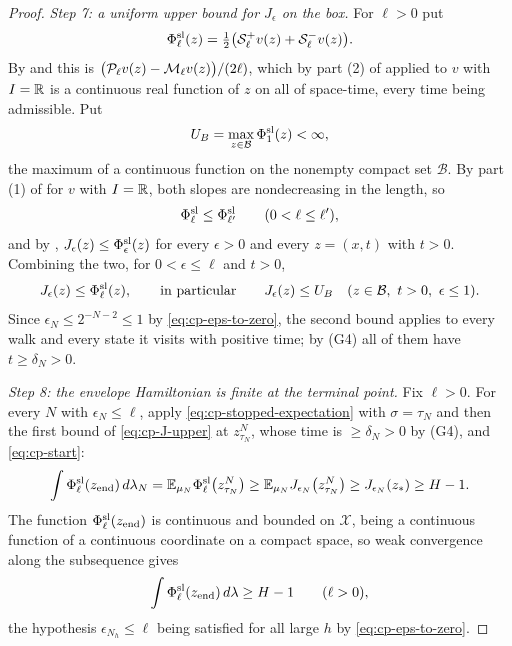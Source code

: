 \begin{proof}
\emph{Step 7: a uniform upper bound for $J_\epsilon$ on the box.}
For $\ell>0$ put
\[
  \Phi^{\rm sl}_\ell(z)=\tfrac12\bigl(\mathcal{S}^+_\ell v(z)+\mathcal{S}^-_\ell v(z)\bigr).
\]
By  and  this is
$\bigl(\mathcal{P}_\ell v(z)-\mathcal{M}_\ell v(z)\bigr)/(2\ell)$, which by part (2) of
 applied to $v$ with $I=\mathbb{R}$ is a continuous real
function of $z$ on all of space-time, every time being admissible. Put
\[
  U_B=\max_{z\in\mathcal B}\Phi^{\rm sl}_1(z)<\infty,
\]
the maximum of a continuous function on the nonempty compact set $\mathcal B$.
By part (1) of  for $v$ with $I=\mathbb{R}$, both
slopes are nondecreasing in the length, so
\begin{equation}\label{eq:cp-slope-mono}
  \Phi^{\rm sl}_\ell\le\Phi^{\rm sl}_{\ell'}\qquad(0<\ell\le\ell'),
\end{equation}
and by ,
$J_\epsilon(z)\le\Phi^{\rm sl}_\epsilon(z)$ for every $\epsilon>0$ and every
$z=(x,t)$ with $t>0$. Combining the two, for $0<\epsilon\le\ell$ and $t>0$,
\begin{equation}\label{eq:cp-J-upper}
  J_\epsilon(z)\le\Phi^{\rm sl}_\ell(z),\qquad\text{in particular}\qquad
  J_\epsilon(z)\le U_B\quad(z\in\mathcal B,\ t>0,\ \epsilon\le1).
\end{equation}
Since $\epsilon_N\le2^{-N-2}\le1$ by \eqref{eq:cp-eps-to-zero}, the second
bound applies to every walk and every state it visits with positive time; by
(G4) all of them have $t\ge\delta_N>0$.

\emph{Step 8: the envelope Hamiltonian is finite at the terminal point.}
Fix $\ell>0$. For every $N$ with $\epsilon_N\le\ell$, apply
\eqref{eq:cp-stopped-expectation} with $\sigma=\tau_N$ and then the first bound
of \eqref{eq:cp-J-upper} at $z^N_{\tau_N}$, whose time is $\ge\delta_N>0$ by
(G4), and \eqref{eq:cp-start}:
\[
  \int\Phi^{\rm sl}_\ell(z_{\rm end})\,d\lambda_N
   =\mathbb E_{\mu_N}\Phi^{\rm sl}_\ell\bigl(z^N_{\tau_N}\bigr)
   \ge\mathbb E_{\mu_N}J_{\epsilon_N}\bigl(z^N_{\tau_N}\bigr)
   \ge J_{\epsilon_N}(z_*)\ge H-1 .
\]
The function $\Phi^{\rm sl}_\ell(z_{\rm end})$ is continuous and bounded on
$\mathcal X$, being a continuous function of a continuous coordinate on a
compact space, so weak convergence along the subsequence gives
\begin{equation}\label{eq:cp-terminal-slopes}
  \int\Phi^{\rm sl}_\ell(z_{\rm end})\,d\lambda\ge H-1\qquad(\ell>0),
\end{equation}
the hypothesis $\epsilon_{N_h}\le\ell$ being satisfied for all large $h$ by
\eqref{eq:cp-eps-to-zero}.


\end{proof}
